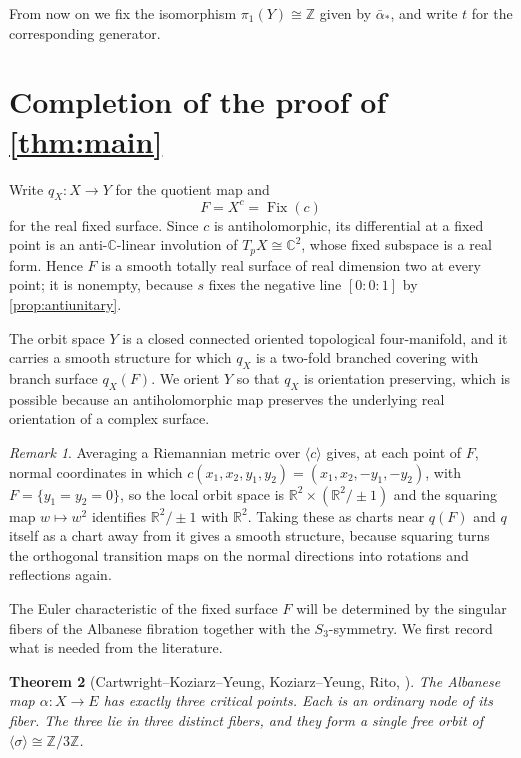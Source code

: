 \documentclass[11pt]{amsart}
\newtheorem{theorem}{Theorem}[section]
\theoremstyle{definition}
\theoremstyle{remark}
\newtheorem{remark}[theorem]{Remark}
\newcommand{\Z}{\mathbb Z}
\newcommand{\R}{\mathbb R}
\newcommand{\C}{\mathbb C}
\newcommand{\Fix}{\operatorname{Fix}}
\begin{document}
From now on we fix the isomorphism $\pi_1(Y)\cong\Z$ given by
$\bar\alpha_*$, and write $t$ for the corresponding generator.

\section{Completion of the proof of \cref{thm:main}}
\label{sec:quotient-manifold}

Write $q_X\colon X\to Y$ for the quotient map and
\[
 F=X^c=\Fix(c)
\]
for the real fixed surface.  Since $c$ is antiholomorphic, its differential
at a fixed point is an anti-$\C$-linear involution of $T_pX\cong\C^2$, whose
fixed subspace is a real form.  Hence $F$ is a smooth totally real surface
of real dimension two at every point; it is nonempty, because $s$ fixes the
negative line $[0:0:1]$ by \cref{prop:antiunitary}.

The orbit space $Y$ is a closed connected oriented topological four-manifold,
and it carries a smooth structure for which $q_X$ is a two-fold branched
covering with branch surface $q_X(F)$.  We orient $Y$ so that $q_X$ is
orientation preserving, which is possible because an antiholomorphic map
preserves the underlying real orientation of a complex surface.

\begin{remark}
Averaging a Riemannian metric over $\langle c\rangle$ gives, at each point of
$F$, normal coordinates in which $c(x_1,x_2,y_1,y_2)=(x_1,x_2,-y_1,-y_2)$,
with $F=\{y_1=y_2=0\}$, so the local orbit space is
$\R^2\times(\R^2/\pm1)$ and the squaring map $w\mapsto w^2$ identifies
$\R^2/\pm1$ with $\R^2$.  Taking these as charts near $q(F)$ and $q$ itself
as a chart away from it gives a smooth structure, because squaring turns the
orthogonal transition maps on the normal directions into rotations and
reflections again.
\end{remark}

The Euler characteristic of the fixed surface
$F$ will be determined by the singular fibers of the
Albanese fibration together with the $S_3$-symmetry.  We first record what
is needed from the literature.


\begin{theorem}[Cartwright--Koziarz--Yeung, Koziarz--Yeung, Rito, \cite{CKY, KY, Rito}]
\label{thm:three-nodes}
The Albanese map $\alpha \colon X\to E$ has exactly three critical points.  Each is
an ordinary node of its fiber. The three lie in three distinct fibers, and
they form a single free orbit of $\langle\sigma\rangle\cong\Z/3\Z$.
\end{theorem}
\end{document}
